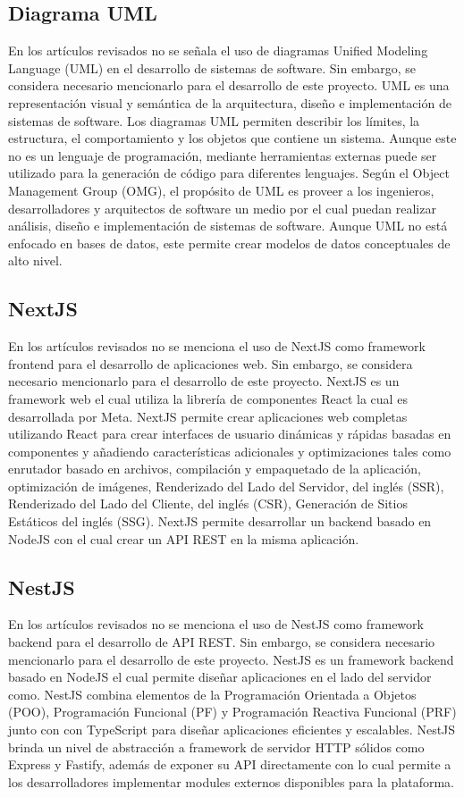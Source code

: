 \subsection{Diagrama UML}
En los artículos revisados no se señala el uso de diagramas Unified Modeling Language (UML) en el desarrollo de sistemas
de software. Sin embargo, se considera necesario mencionarlo para el desarrollo de este proyecto. UML es una
representación visual y semántica de la arquitectura, diseño e implementación de sistemas de software. Los diagramas
UML permiten describir los límites, la estructura, el comportamiento y los objetos que contiene un sistema. Aunque este
no es un lenguaje de programación, mediante herramientas externas puede ser utilizado para la generación de código para
diferentes lenguajes. Según el Object Management Group (OMG), el propósito de UML es proveer a los ingenieros,
desarrolladores y arquitectos de software un medio por el cual puedan realizar análisis, diseño e implementación de
sistemas de software. Aunque UML no está enfocado en bases de datos, este permite crear modelos de datos conceptuales
de alto nivel.

\subsection{NextJS}
En los artículos revisados no se menciona el uso de NextJS como framework frontend para el desarrollo de aplicaciones web.
Sin embargo, se considera necesario mencionarlo para el desarrollo de este proyecto. NextJS es un framework web el cual
utiliza la librería de componentes React la cual es desarrollada por Meta. NextJS permite crear aplicaciones web
completas utilizando React para crear interfaces de usuario dinámicas y rápidas basadas en componentes y añadiendo
características adicionales y optimizaciones tales como enrutador basado en archivos, compilación y empaquetado de la
aplicación, optimización de imágenes, Renderizado del Lado del Servidor, del inglés (SSR), Renderizado del Lado del Cliente, del inglés (CSR),
Generación de Sitios Estáticos del inglés (SSG). NextJS permite desarrollar un backend basado en NodeJS con el cual crear un API
REST en la misma aplicación.

\subsection{NestJS}
En los artículos revisados no se menciona el uso de NestJS como framework backend para el desarrollo de API REST.
Sin embargo, se considera necesario mencionarlo para el desarrollo de este proyecto. NestJS es un framework backend
basado en NodeJS el cual permite diseñar aplicaciones en el lado del servidor como. NestJS combina elementos de la
Programación Orientada a Objetos (POO), Programación Funcional (PF) y Programación Reactiva Funcional (PRF) junto con con
TypeScript para diseñar aplicaciones eficientes y escalables. NestJS brinda un nivel de abstracción a framework de
servidor HTTP sólidos como Express y Fastify, además de exponer su API directamente con lo cual permite a los
desarrolladores implementar modules externos disponibles para la plataforma.

